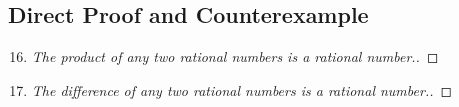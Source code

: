 \documentclass[12pt]{article}
\begin{document}
\subsection{Direct Proof and Counterexample} %
\begin{enumerate}
\setcounter{enumi}{15}
\item %
  \begin{proof}[The product of any two rational numbers is a rational number.]

  \end{proof}

\item %
  \begin{proof}[The difference of any two rational numbers is a rational number.]
  \end{proof}
\end{enumerate}
\end{document}
